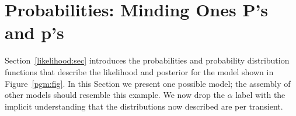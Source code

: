 \documentclass[preprint,3p]{elsarticle}
\begin{document}

\section{Probabilities: Minding Ones P's and p's}
Section~\ref{likelihood:sec} introduces the probabilities and probability distribution functions that describe the likelihood
and posterior for the model shown in Figure~\ref{pgm:fig}.
In this Section we present one possible model; the assembly of other models should
resemble this example.
We now drop the $\alpha$ label with the implicit understanding that the distributions
now described are per transient.
\end{document}
